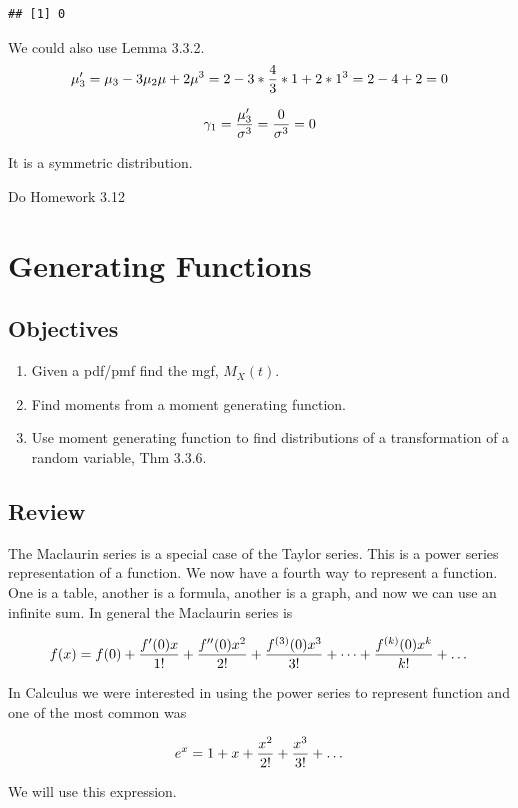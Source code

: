 \documentclass[]{book}
\providecommand{\tightlist}{%
  \setlength{\itemsep}{0pt}\setlength{\parskip}{0pt}}
\theoremstyle{definition}
\theoremstyle{definition}
\theoremstyle{definition}
\theoremstyle{remark}
\begin{document}
\begin{verbatim}
## [1] 0
\end{verbatim}

We could also use Lemma 3.3.2.
\[\mu_{3}'=\mu_{3}-3\mu_{2}\mu+2\mu^3=2-3*{4 \over 3}*1+2*1^3=2-4+2=0\]

\[\gamma_1={\mu_{3}' \over \sigma^3}={0 \over \sigma^3}=0\]

It is a symmetric distribution.

Do Homework 3.12

\hypertarget{L14}{\section{Generating Functions}\label{L14}}

\subsection{Objectives}\label{objectives-13}

\begin{enumerate}
\def\labelenumi{\arabic{enumi}.}
\tightlist
\item
  Given a pdf/pmf find the mgf, \(M_{X}(t)\).
\item
  Find moments from a moment generating function.
\item
  Use moment generating function to find distributions of a
  transformation of a random variable, Thm 3.3.6.
\end{enumerate}

\subsection{Review}\label{review-2}

The Maclaurin series is a special case of the Taylor series. This is a
power series representation of a function. We now have a fourth way to
represent a function. One is a table, another is a formula, another is a
graph, and now we can use an infinite sum. In general the Maclaurin
series is

\[f(x)=f(0)+{f'(0)x \over 1!}+{f''(0)x^2 \over 2!}+{f^{(3)}(0)x^3 \over 3!}+\dots+{f^{(k)}(0)x^k \over k!}+\dots\]

In Calculus we were interested in using the power series to represent
function and one of the most common was

\[e^x=1+x+{x^2 \over 2!}+{x^3 \over 3!}+\dots\]

We will use this expression.
\end{document}
